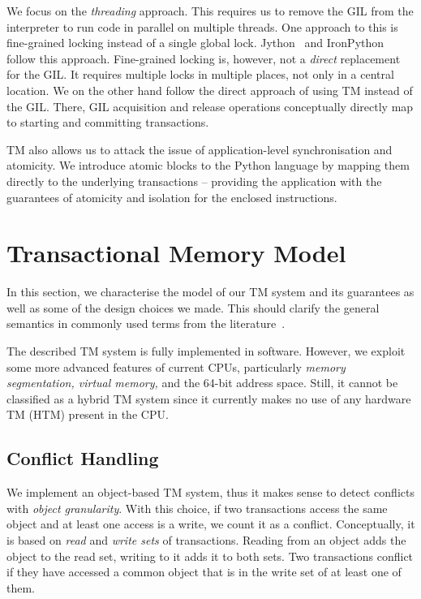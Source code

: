 \documentclass{sigplanconf}
\begin{document}
We focus on the \emph{threading} approach. This requires us to remove
the GIL from the interpreter to run code in parallel on multiple
threads. One approach to this is fine-grained locking instead of a
single global lock. Jython~\cite{webjython} and
IronPython~\cite{ironpython} follow this approach. Fine-grained
locking is, however, not a \emph{direct} replacement for the GIL. It
requires multiple locks in multiple places, not only in a central
location. We on the other hand follow the direct approach of using TM
instead of the GIL. There, GIL acquisition and release operations
conceptually directly map to starting and committing transactions.

TM also allows us to attack the issue of application-level
synchronisation and atomicity. We introduce atomic blocks to the
Python language by mapping them directly to the underlying
transactions -- providing the application with the guarantees of
atomicity and isolation for the enclosed instructions.


\section{Transactional Memory Model}

In this section, we characterise the model of our TM system and its
guarantees as well as some of the design choices we made. This should
clarify the general semantics in commonly used terms from the
literature~\cite{harris10}.

The described TM system is fully implemented in software. However, we exploit
some more advanced features of current CPUs, particularly \emph{memory
segmentation, virtual memory,} and the 64-bit address space. Still,
it cannot be classified as a hybrid TM system since it currently
makes no use of any hardware TM (HTM) present in the CPU.

\subsection{Conflict Handling}

We implement an object-based TM system, thus it makes sense to detect
conflicts with \emph{object granularity}. With this choice, if two
transactions access the same object and at least one access is a
write, we count it as a conflict. Conceptually, it is based on
\emph{read} and \emph{write sets} of transactions. Reading from an
object adds the object to the read set, writing to it adds it to both
sets. Two transactions conflict if they have accessed a common object
that is in the write set of at least one of them.
\end{document}
